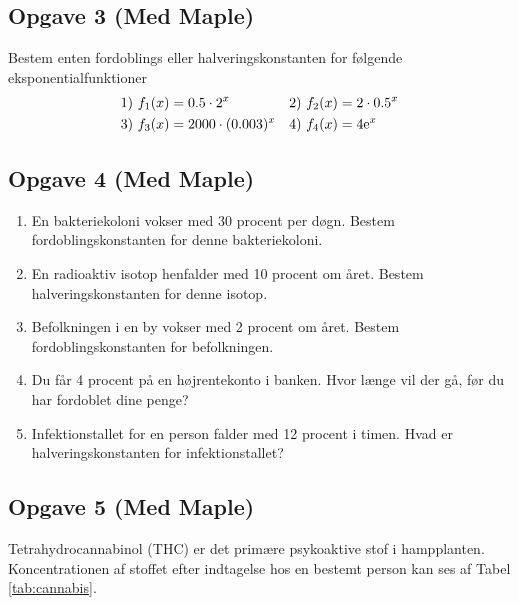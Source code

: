 \documentclass[12pt]{article}
\begin{document}
\subsection*{Opgave 3 (Med Maple)}
Bestem enten fordoblings eller halveringskonstanten for følgende eksponentialfunktioner
\begin{align*}
&1) \ f_1(x) = 0.5\cdot 2^x   &&2) \ f_2(x)=2\cdot 0.5^x  \\
&3) \ f_3(x) = 2000\cdot(0.003)^x  &&4) \ f_4(x) = 4\textnormal{e}^x  \\
\end{align*}

\subsection*{Opgave 4 (Med Maple)}

\begin{enumerate}[label=\roman*)]
	\item En bakteriekoloni vokser med 30 procent per døgn. Bestem fordoblingskonstanten for denne bakteriekoloni.
	\item En radioaktiv isotop henfalder med 10 procent om året. Bestem halveringskonstanten for denne isotop.
	\item Befolkningen i en by vokser med 2 procent om året. Bestem fordoblingskonstanten for befolkningen. 
	\item Du får 4 procent på en højrentekonto i banken. Hvor længe vil der gå, før du har fordoblet dine penge?
	\item Infektionstallet for en person falder med 12 procent i timen. Hvad er halveringskonstanten for infektionstallet?
\end{enumerate}
\newpage
\subsection*{Opgave 5 (Med Maple)}
Tetrahydrocannabinol (THC) er det primære psykoaktive stof i hampplanten. Koncentrationen af stoffet efter indtagelse hos en bestemt person kan ses af Tabel \ref{tab:cannabis}.
\end{document}
